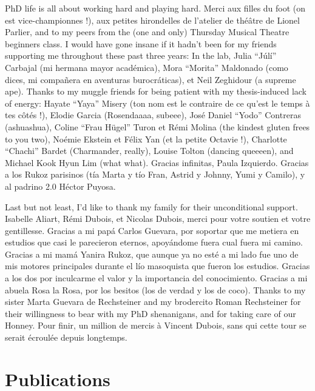 \documentclass[12pt, twoside]{report}
\begin{document}
PhD life is all about working hard and playing hard. Merci aux filles du foot (on est vice-championnes !), aux petites hirondelles de l'atelier de théâtre de Lionel Parlier, and to my peers from the (one and only) Thursday Musical Theatre beginners class. I would have gone insane if it hadn't been for my friends supporting me throughout these past three years: In the lab, Julia ``Júlí'' Carbajal (mi hermana mayor académica), Mora ``Morita'' Maldonado (como dices, mi compañera en aventuras burocráticas), et Neil Zeghidour (a supreme ape).  Thanks to my muggle friends for being patient with my thesis-induced lack of energy: Hayate ``Yaya'' Misery (ton nom est le contraire de ce qu'est le temps à tes côtés !), Elodie Garcia (Rosendaaaa, subeee), José Daniel ``Yodo'' Contreras (ashuashua), Coline ``Frau Hügel'' Turon et Rémi Molina (the kindest gluten frees to you two), Noémie Ekstein et Félix Yan (et la petite Octavie !), Charlotte ``Chachi'' Bardet (Charmander, really), Louise Tolton (dancing queeeen), and Michael Kook Hyun Lim (what what). Gracias infinitas, Paula Izquierdo. Gracias a los Rukoz parisinos (tía Marta y tío Fran, Astrid y Johnny, Yumi y Camilo), y al padrino 2.0 Héctor Puyosa.   

Last but not least, I'd like to thank my family for their unconditional support. Isabelle Aliart, Rémi Dubois, et Nicolas Dubois, merci pour votre soutien et votre gentillesse. Gracias a mi papá Carlos Guevara, por soportar que me metiera en estudios que casi le parecieron eternos, apoyándome fuera cual fuera mi camino. Gracias a mi mamá Yanira Rukoz, que aunque ya no esté a mi lado fue uno de mis motores principales durante el lío masoquista que fueron los estudios. Gracias a los dos por inculcarme el valor y la importancia del conocimiento. Gracias a mi abuela Rosa la Rosa, por los besitos (los de verdad y los de coco). Thanks to my sister Marta Guevara de Rechsteiner and my brodercito Roman Rechsteiner for their willingness to bear with my PhD shenanigans, and for taking care of our Honney. Pour finir, un million de mercis à Vincent Dubois, sans qui cette tour se serait écroulée depuis longtemps.              
  
\chapter*{Publications}
\end{document}
